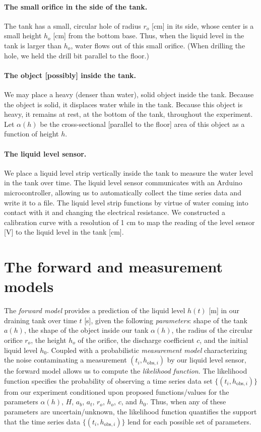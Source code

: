 \documentclass[openacc]{rsproca_new}%
\begin{document}
\paragraph{The small orifice in the side of the tank.} The tank has a small, circular hole of radius $r_o$ [cm] in its side, whose center is a small height $h_o$ [cm] from the bottom base.
Thus, when the liquid level in the tank is larger than $h_o$, water flows out of this small orifice.
(When drilling the hole, we held the drill bit parallel to the floor.) 

\paragraph{The object [possibly] inside the tank.} We may place a heavy (denser than water), solid object inside the tank. Because the object is solid, it displaces water while in the tank. Because this object is heavy, it remains at rest, at the bottom of the tank, throughout the experiment. Let $\alpha(h)$ be the cross-sectional [parallel to the floor] area of this object as a function of height $h$.

\paragraph{The liquid level sensor.} We place a liquid level strip vertically inside the tank to measure the water level in the tank over time. The liquid level sensor communicates with an Arduino microcontroller, allowing us to automatically collect the time series data and write it to a file. The liquid level strip functions by virtue of water coming into contact with it and changing the electrical resistance. 
We constructed a calibration curve with a resolution of 1 cm to map the reading of the level sensor [V] to the liquid level in the tank [cm]. 

\section{The forward and measurement models}
The \emph{forward model} provides a prediction of the liquid level $h(t)$ [m] in our draining tank over time $t$ [s], given the following \emph{parameters}: shape of the tank $a(h)$, the shape of the object inside our tank $\alpha(h)$, the radius of the circular orifice $r_o$, the height $h_o$ of the orifice, the discharge coefficient $c$, and the initial liquid level $h_0$. 
Coupled with a probabilistic \emph{measurement model} characterizing the noise contaminating a measurement $(t_i, h_{\text{obs}, i})$ by our liquid level sensor, the forward model allows us to compute the \emph{likelihood function}. The likelihood function specifies the probability of observing a time series data set $\{(t_i, h_{\text{obs}, i})\}$ from our experiment conditioned upon proposed functions/values for the parameters $\alpha(h)$, $H$, $a_b$, $a_t$, $r_o$, $h_o$, $c$, and $h_0$. Thus, when any of these parameters are uncertain/unknown, the likelihood function quantifies the support that the time series data $\{(t_i, h_{\text{obs}, i})\}$ lend for each possible set of parameters.
\end{document}
